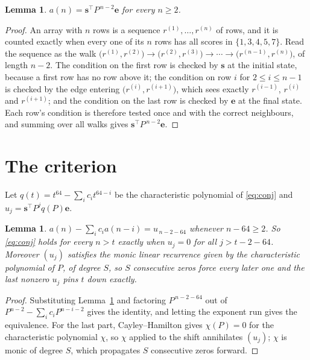 \documentclass[11pt,a4paper]{article}
\theoremstyle{plain}
\newtheorem{lemma}[theorem]{Lemma}
\theoremstyle{definition}
\begin{document}
\begin{lemma}\label{lem:walk}
$a(n)=\mathbf{s}^{\!\top}P^{\,n-2}\mathbf{e}$ for every $n\ge2$.
\end{lemma}

\begin{proof}
An array with $n$ rows is a sequence $r^{(1)},\dots,r^{(n)}$ of rows, and it is counted
exactly when every one of its $n$ rows has all scores in $\{1,3,4,5,7\}$. Read the sequence as the
walk $\bigl(r^{(1)},r^{(2)}\bigr)\to\bigl(r^{(2)},r^{(3)}\bigr)\to\cdots\to
\bigl(r^{(n-1)},r^{(n)}\bigr)$, of length $n-2$. The condition on the first row is
checked by $\mathbf{s}$ at the initial state, because a first row has no row above it; the
condition on row $i$ for $2\le i\le n-1$ is checked by the edge entering
$\bigl(r^{(i)},r^{(i+1)}\bigr)$, which sees exactly $r^{(i-1)}$, $r^{(i)}$ and
$r^{(i+1)}$; and the condition on the last row is checked by $\mathbf{e}$ at the final
state. Each row's condition is therefore tested once and with the correct neighbours, and
summing over all walks gives $\mathbf{s}^{\!\top}P^{\,n-2}\mathbf{e}$.
\end{proof}

\section{The criterion}

Let $q(t)=t^{64}-\sum_i c_i t^{64-i}$ be the characteristic polynomial of
\eqref{eq:conj} and $u_j=\mathbf{s}^{\!\top}P^{j}q(P)\mathbf{e}$.

\begin{lemma}\label{lem:crit}
$a(n)-\sum_i c_i a(n-i)=u_{\,n-2-64}$ whenever $n-64\ge2$. So \eqref{eq:conj}
holds for every $n>t$ exactly when $u_j=0$ for all $j>t-2-64$. Moreover $(u_j)$
satisfies the monic linear recurrence given by the characteristic polynomial of $P$, of
degree $S$, so $S$ consecutive zeros force every later one and the last nonzero $u_j$ pins
$t$ down exactly.
\end{lemma}

\begin{proof}
Substituting Lemma~\ref{lem:walk} and factoring $P^{\,n-2-64}$ out of
$P^{n-2}-\sum_i c_i P^{n-i-2}$ gives the identity, and letting the exponent run gives the
equivalence. For the last part, Cayley--Hamilton gives $\chi(P)=0$ for the characteristic
polynomial $\chi$, so $\chi$ applied to the shift annihilates $(u_j)$; $\chi$ is monic of
degree $S$, which propagates $S$ consecutive zeros forward.
\end{proof}
\end{document}
